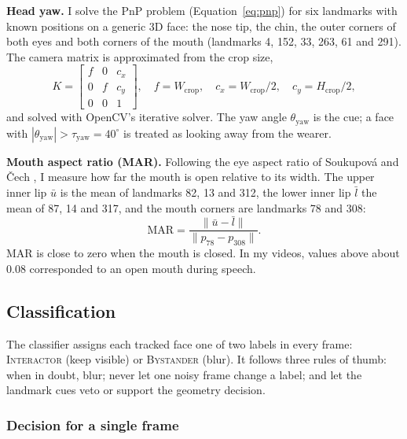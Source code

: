 \textbf{Head yaw.} I solve the PnP problem (Equation~\ref{eq:pnp}) for six landmarks with
known positions on a generic 3D face: the nose tip, the chin, the outer corners of both
eyes and both corners of the mouth (landmarks 4, 152, 33, 263, 61 and 291). The camera
matrix is approximated from the crop size,
\begin{equation}
  K = \begin{bmatrix} f & 0 & c_x \\ 0 & f & c_y \\ 0 & 0 & 1 \end{bmatrix},
  \quad f = W_{\mathrm{crop}}, \quad c_x = W_{\mathrm{crop}}/2, \quad c_y = H_{\mathrm{crop}}/2,
  \label{eq:camera_matrix}
\end{equation}
and solved with OpenCV's iterative solver. The yaw angle $\theta_{\mathrm{yaw}}$ is the
cue; a face with $|\theta_{\mathrm{yaw}}| > \tau_{\mathrm{yaw}} = 40^\circ$ is treated as
looking away from the wearer.

\textbf{Mouth aspect ratio (MAR).} Following the eye aspect ratio of Soukupov\'a and
\v{C}ech \cite{soukupova2016}, I measure how far the mouth is open relative to its width.
The upper inner lip $\bar{u}$ is the mean of landmarks 82, 13 and 312, the lower inner lip
$\bar{l}$ the mean of 87, 14 and 317, and the mouth corners are landmarks 78 and 308:
\begin{equation}
  \mathrm{MAR} = \frac{\lVert \bar{u} - \bar{l} \rVert}{\lVert p_{78} - p_{308} \rVert}.
  \label{eq:mar}
\end{equation}
MAR is close to zero when the mouth is closed. In my videos, values above about 0.08
corresponded to an open mouth during speech.

\subsection{Classification}
\label{sec:classification}

The classifier assigns each tracked face one of two labels in every frame:
\textsc{Interactor} (keep visible) or \textsc{Bystander} (blur). It follows three rules
of thumb: when in doubt, blur; never let one noisy frame change a label; and let the
landmark cues veto or support the geometry decision.

\subsubsection{Decision for a single frame}

